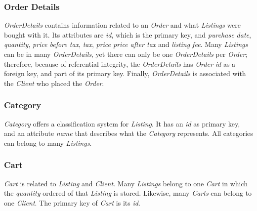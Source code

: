 \documentclass[11pt]{article}
\newcounter{use case ID}
\begin{document}
\subsubsection{Order Details}
\textit{OrderDetails} contains information related to an \textit{Order} and what \textit{Listings} were bought with it. Its attributes are \textit{id}, which is the primary key, and \textit{purchase date}, \textit{quantity}, \textit{price before tax}, \textit{tax}, \textit{price price after tax} and \textit{listing fee}. Many \textit{Listings} can be in many \textit{OrderDetails}, yet there can only be one \textit{OrderDetails} per \textit{Order}; therefore, because of referential integrity, the \textit{OrderDetails} has \textit{Order id} as a foreign key, and part of its primary key. Finally, \textit{OrderDetails} is associated with the \textit{Client} who placed the \textit{Order}.

\subsubsection{Category}
\textit{Category} offers a classification system for \textit{Listing}. It has an \textit{id} as primary key, and an attribute \textit{name} that describes what the \textit{Category} represents. All categories can belong to many \textit{Listings}.

\subsubsection{Cart}
\textit{Cart} is related to \textit{Listing} and \textit{Client}. Many \textit{Listings} belong to one \textit{Cart} in which the \textit{quantity} ordered of that \textit{Listing} is stored. Likewise, many \textit{Carts} can belong to one \textit{Client}. The primary key of \textit{Cart} is its \textit{id}.
\clearpage
\end{document}
